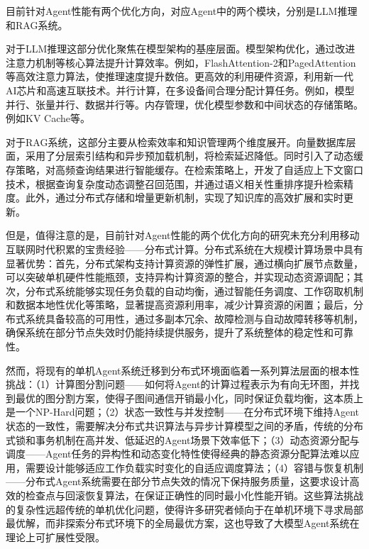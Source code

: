 目前针对Agent性能有两个优化方向，对应Agent中的两个模块，分别是LLM推理和RAG系统。

对于LLM推理这部分优化聚焦在模型架构的基座层面。模型架构优化，通过改进注意力机制等核心算法提升计算效率。例如，FlashAttention-2\cite{dao2023flashattention2fasterattentionbetter}和PagedAttention\cite{10.1145/3600006.3613165}等高效注意力算法，使推理速度提升数倍。更高效的利用硬件资源，利用新一代AI芯片和高速互联技术。并行计算，在多设备间合理分配计算任务。例如，模型并行、张量并行、数据并行等\cite{shoeybi2020megatronlmtrainingmultibillionparameter,10.1145/3458817.3476209,li2020pytorchdistributedexperiencesaccelerating}。内存管理，优化模型参数和中间状态的存储策略。例如KV Cache等\cite{298501}。

对于RAG系统，这部分主要从检索效率和知识管理两个维度展开。向量数据库层面，采用了分层索引结构和异步预加载机制\cite{8594636}，将检索延迟降低。同时引入了动态缓存策略，对高频查询结果进行智能缓存。在检索策略上，开发了自适应上下文窗口技术，根据查询复杂度动态调整召回范围，并通过语义相关性重排序提升检索精度\cite{lim2025macragcompressslicescaleup}。此外，通过分布式存储和增量更新机制，实现了知识库的高效扩展和实时更新\cite{li2025eacoragdistributedtieredllm}。

但是，值得注意的是，目前针对Agent性能的两个优化方向的研究未充分利用移动互联网时代积累的宝贵经验——分布式计算。分布式系统在大规模计算场景中具有显著优势：首先，分布式架构支持计算资源的弹性扩展，通过横向扩展节点数量，可以突破单机硬件性能瓶颈，支持异构计算资源的整合，并实现动态资源调配；其次，分布式系统能够实现任务负载的自动均衡，通过智能任务调度、工作窃取机制和数据本地性优化等策略，显著提高资源利用率，减少计算资源的闲置；最后，分布式系统具备较高的可用性，通过多副本冗余、故障检测与自动故障转移等机制，确保系统在部分节点失效时仍能持续提供服务，提升了系统整体的稳定性和可靠性。

然而，将现有的单机Agent系统迁移到分布式环境面临着一系列算法层面的根本性挑战：（1）计算图分割问题——如何将Agent的计算过程表示为有向无环图，并找到最优的图分割方案，使得子图间通信开销最小化，同时保证负载均衡，这本质上是一个NP-Hard问题；（2）状态一致性与并发控制——在分布式环境下维持Agent状态的一致性，需要解决分布式共识算法与异步计算模型之间的矛盾，传统的分布式锁和事务机制在高并发、低延迟的Agent场景下效率低下；（3）动态资源分配与调度——Agent任务的异构性和动态变化特性使得经典的静态资源分配算法难以应用，需要设计能够适应工作负载实时变化的自适应调度算法；（4）容错与恢复机制——分布式Agent系统需要在部分节点失效的情况下保持服务质量，这要求设计高效的检查点与回滚恢复算法，在保证正确性的同时最小化性能开销。这些算法挑战的复杂性远超传统的单机优化问题，使得许多研究者倾向于在单机环境下寻求局部最优解，而非探索分布式环境下的全局最优方案，这也导致了大模型Agent系统在理论上可扩展性受限。

